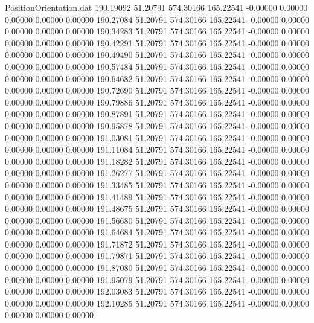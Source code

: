 \begin{filecontents}{PositionOrientation.dat}
 190.19092   51.20791  574.30166   165.22541   -0.00000    0.00000    0.00000    0.00000    0.00000
 190.27084   51.20791  574.30166   165.22541   -0.00000    0.00000    0.00000    0.00000    0.00000
 190.34283   51.20791  574.30166   165.22541   -0.00000    0.00000    0.00000    0.00000    0.00000
 190.42291   51.20791  574.30166   165.22541   -0.00000    0.00000    0.00000    0.00000    0.00000
 190.49490   51.20791  574.30166   165.22541   -0.00000    0.00000    0.00000    0.00000    0.00000
 190.57484   51.20791  574.30166   165.22541   -0.00000    0.00000    0.00000    0.00000    0.00000
 190.64682   51.20791  574.30166   165.22541   -0.00000    0.00000    0.00000    0.00000    0.00000
 190.72690   51.20791  574.30166   165.22541   -0.00000    0.00000    0.00000    0.00000    0.00000
 190.79886   51.20791  574.30166   165.22541   -0.00000    0.00000    0.00000    0.00000    0.00000
 190.87891   51.20791  574.30166   165.22541   -0.00000    0.00000    0.00000    0.00000    0.00000
 190.95878   51.20791  574.30166   165.22541   -0.00000    0.00000    0.00000    0.00000    0.00000
 191.03081   51.20791  574.30166   165.22541   -0.00000    0.00000    0.00000    0.00000    0.00000
 191.11084   51.20791  574.30166   165.22541   -0.00000    0.00000    0.00000    0.00000    0.00000
 191.18282   51.20791  574.30166   165.22541   -0.00000    0.00000    0.00000    0.00000    0.00000
 191.26277   51.20791  574.30166   165.22541   -0.00000    0.00000    0.00000    0.00000    0.00000
 191.33485   51.20791  574.30166   165.22541   -0.00000    0.00000    0.00000    0.00000    0.00000
 191.41489   51.20791  574.30166   165.22541   -0.00000    0.00000    0.00000    0.00000    0.00000
 191.48675   51.20791  574.30166   165.22541   -0.00000    0.00000    0.00000    0.00000    0.00000
 191.56680   51.20791  574.30166   165.22541   -0.00000    0.00000    0.00000    0.00000    0.00000
 191.64684   51.20791  574.30166   165.22541   -0.00000    0.00000    0.00000    0.00000    0.00000
 191.71872   51.20791  574.30166   165.22541   -0.00000    0.00000    0.00000    0.00000    0.00000
 191.79871   51.20791  574.30166   165.22541   -0.00000    0.00000    0.00000    0.00000    0.00000
 191.87080   51.20791  574.30166   165.22541   -0.00000    0.00000    0.00000    0.00000    0.00000
 191.95079   51.20791  574.30166   165.22541   -0.00000    0.00000    0.00000    0.00000    0.00000
 192.03083   51.20791  574.30166   165.22541   -0.00000    0.00000    0.00000    0.00000    0.00000
 192.10285   51.20791  574.30166   165.22541   -0.00000    0.00000    0.00000    0.00000    0.00000

\end{filecontents}
